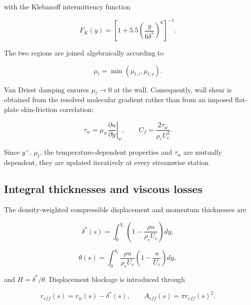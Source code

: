with the Klebanoff intermittency function

\begin{equation}
F_K(y)=
\left[
1+5.5\left(\frac{y}{6\delta^*}\right)^6
\right]^{-1}.
\label{eq:blimp_klebanoff}
\end{equation}

The two regions are joined algebraically according to

\begin{equation}
\boxed{\mu_t=\min\!\left(\mu_{t,i},\mu_{t,o}\right)}.
\label{eq:blimp_eddy_join}
\end{equation}

Van Driest damping ensures \(\mu_t\rightarrow0\) at the wall. Consequently, wall
shear is obtained from the resolved molecular gradient rather than from an imposed
flat-plate skin-friction correlation:

\begin{equation}
\boxed{
\tau_w=\mu_w\left.\frac{\partial u}{\partial y}\right|_w
},
\qquad
\boxed{
C_f=\frac{2\tau_w}{\rho_eU_e^2}
}.
\label{eq:blimp_skin_friction}
\end{equation}

Since \(y^+\), \(\mu_t\), the temperature-dependent properties and \(\tau_w\) are
mutually dependent, they are updated iteratively at every streamwise station.

\subsection{Integral thicknesses and viscous losses}

The density-weighted compressible displacement and momentum thicknesses are

\begin{equation}
\boxed{
\delta^*(s)=\int_0^{y_e}
\left(1-\frac{\rho u}{\rho_eU_e}\right)dy
},
\label{eq:blimp_displacement_thickness}
\end{equation}

\begin{equation}
\boxed{
\theta(s)=\int_0^{y_e}
\frac{\rho u}{\rho_eU_e}
\left(1-\frac{u}{U_e}\right)dy
},
\label{eq:blimp_momentum_thickness}
\end{equation}

and \(H=\delta^*/\theta\). Displacement blockage is introduced through

\begin{equation}
r_{eff}(s)=r_w(s)-\delta^*(s),
\qquad
A_{eff}(s)=\pi r_{eff}(s)^2.
\label{eq:blimp_effective_area}
\end{equation}

